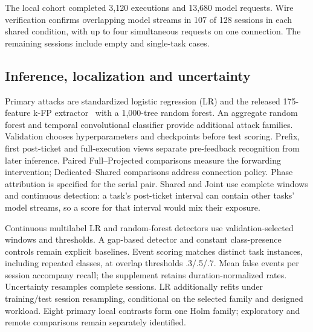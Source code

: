 The local cohort completed 3,120 executions and 13,680 model requests. Wire verification confirms overlapping model streams in 107 of 128 sessions in each shared condition, with up to four simultaneous requests on one connection. The remaining sessions include empty and single-task cases.

\subsection{Inference, localization and uncertainty}
Primary attacks are standardized logistic regression (LR) and the released 175-feature k-FP extractor~\cite{hayes2016kfp} with a 1,000-tree random forest. An aggregate random forest and temporal convolutional classifier provide additional attack families. Validation chooses hyperparameters and checkpoints before test scoring. Prefix, first post-ticket and full-execution views separate pre-feedback recognition from later inference. Paired Full--Projected comparisons measure the forwarding intervention; Dedicated--Shared comparisons address connection policy. Phase attribution is specified for the serial pair. Shared and Joint use complete windows and continuous detection: a task's post-ticket interval can contain other tasks' model streams, so a score for that interval would mix their exposure.

Continuous multilabel LR and random-forest detectors use validation-selected windows and thresholds. A gap-based detector and constant class-presence controls remain explicit baselines. Event scoring matches distinct task instances, including repeated classes, at overlap thresholds .3/.5/.7. Mean false events per session accompany recall; the supplement retains duration-normalized rates. Uncertainty resamples complete sessions. LR additionally refits under training/test session resampling, conditional on the selected family and designed workload. Eight primary local contrasts form one Holm family; exploratory and remote comparisons remain separately identified.
